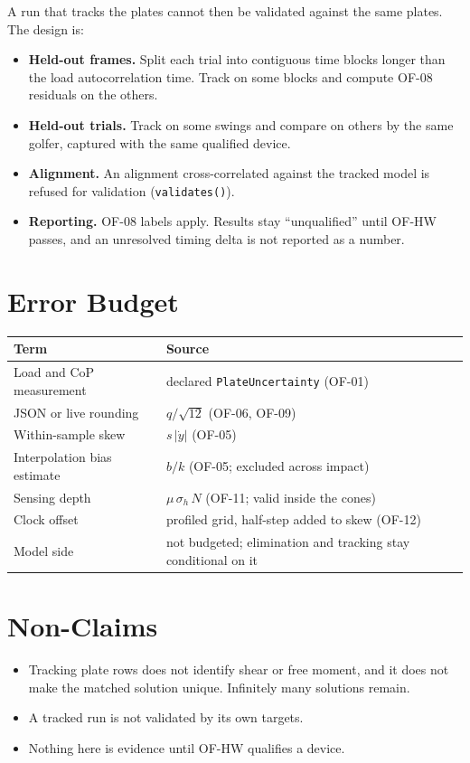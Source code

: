 \documentclass[11pt]{article}
\begin{document}
A run that tracks the plates cannot then be validated against the same
plates. The design is:
\begin{itemize}
  \item \textbf{Held-out frames.} Split each trial into contiguous time
        blocks longer than the load autocorrelation time. Track on some
        blocks and compute OF-08 residuals on the others.
  \item \textbf{Held-out trials.} Track on some swings and compare on others
        by the same golfer, captured with the same qualified device.
  \item \textbf{Alignment.} An alignment cross-correlated against the
        tracked model is refused for validation (\texttt{validates()}).
  \item \textbf{Reporting.} OF-08 labels apply. Results stay ``unqualified''
        until OF-HW passes, and an unresolved timing delta is not reported
        as a number.
\end{itemize}

\section{Error Budget}

\begin{tabular}{@{}ll@{}}
\toprule
Term & Source \\
\midrule
Load and CoP measurement & declared \texttt{PlateUncertainty} (OF-01) \\
JSON or live rounding & $q/\sqrt{12}$ (OF-06, OF-09) \\
Within-sample skew & $s\,|\dot y|$ (OF-05) \\
Interpolation bias estimate & $b/k$ (OF-05; excluded across impact) \\
Sensing depth & $\mu\,\sigma_h\,N$ (OF-11; valid inside the cones) \\
Clock offset & profiled grid, half-step added to skew (OF-12) \\
Model side & not budgeted; elimination and tracking stay conditional on it \\
\bottomrule
\end{tabular}

\section{Non-Claims}

\begin{itemize}
  \item Tracking plate rows does not identify shear or free moment, and it
        does not make the matched solution unique. Infinitely many solutions
        remain.
  \item A tracked run is not validated by its own targets.
  \item Nothing here is evidence until OF-HW qualifies a device.
\end{itemize}
\end{document}
